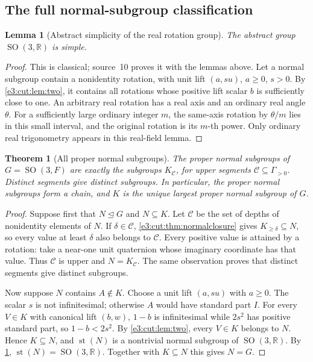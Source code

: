 \documentclass[11pt,letterpaper]{article}
\numberwithin{equation}{section}
\newtheorem{theorem}{Theorem}[section]
\newtheorem{lemma}[lemma]{Lemma}
\theoremstyle{definition}
\theoremstyle{remark}
\newcommand{\R}{\mathbb R}
\newcommand{\st}{\operatorname{st}}
\newcommand{\SO}{\operatorname{SO}}
\begin{document}
\subsection{The full normal-subgroup classification}

\begin{lemma}[Abstract simplicity of the real rotation group]\label{e3:cut:lem:realsimple}
The abstract group $\SO(3,\R)$ is simple.
\end{lemma}
\begin{proof}
This is classical; source~10 proves it with the lemmas above. Let a normal
subgroup contain a nonidentity rotation, with unit lift $(a,su)$, $a\ge0$,
$s>0$. By \cref{e3:cut:lem:two}, it contains all rotations whose positive lift
scalar $b$ is sufficiently close to one. An arbitrary real rotation has a real
axis and an ordinary real angle $\theta$. For a sufficiently large ordinary
integer $m$, the same-axis rotation by $\theta/m$ lies in this small interval,
and the original rotation is its $m$-th power. Only ordinary real trigonometry
appears in this real-field lemma.
\end{proof}

\begin{theorem}[All proper normal subgroups]\label{e3:cut:thm:normalclass}
The proper normal subgroups of $G=\SO(3,F)$ are exactly the subgroups
$K_{\mathcal C}$, for upper segments $\mathcal C\subseteq\Gamma_{>0}$.
Distinct segments give distinct subgroups. In particular, the proper normal
subgroups form a chain, and $K$ is the unique largest proper normal subgroup
of $G$.
\end{theorem}
\begin{proof}
Suppose first that $N\trianglelefteq G$ and $N\subseteq K$. Let $\mathcal C$
be the set of depths of nonidentity elements of $N$. If $\delta\in\mathcal C$,
\cref{e3:cut:thm:normalclosure} gives $K_{\ge\delta}\subseteq N$, so every
value at least $\delta$ also belongs to $\mathcal C$. Every positive value is
attained by a rotation: take a near-one unit quaternion whose imaginary
coordinate has that value. Thus $\mathcal C$ is upper and $N=K_{\mathcal C}$.
The same observation proves that distinct segments give distinct subgroups.

Now suppose $N$ contains $A\notin K$. Choose a unit lift $(a,su)$ with $a\ge0$.
The scalar $s$ is not infinitesimal; otherwise $A$ would have standard part
$I$. For every $V\in K$ with canonical lift $(b,w)$, $1-b$ is infinitesimal
while $2s^2$ has positive standard part, so $1-b<2s^2$. By
\cref{e3:cut:lem:two}, every $V\in K$ belongs to $N$. Hence $K\subseteq N$,
and $\st(N)$ is a nontrivial normal subgroup of $\SO(3,\R)$. By
\cref{e3:cut:lem:realsimple}, $\st(N)=\SO(3,\R)$. Together with
$K\subseteq N$ this gives $N=G$.
\end{proof}
\end{document}
